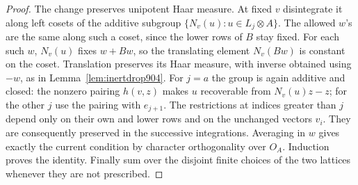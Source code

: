 \documentclass[a4paper,11pt]{article}
\theoremstyle{definition}
\theoremstyle{remark}
\numberwithin{equation}{section}
\begin{document}
\begin{proof}
The change preserves unipotent Haar measure. At fixed \(v\)
disintegrate it along left cosets of the additive subgroup
\(\{N_v(u):u\in L_j\otimes A\}\). The allowed \(w\)'s are the
same along such a coset, since the lower rows of \(B\) stay
fixed. For each such \(w\), \(N_v(u)\) fixes \(w+Bw\), so the
translating element \(N_v(Bw)\) is constant on the coset.
Translation preserves its Haar measure, with inverse obtained
using \(-w\), as in Lemma~\ref{lem:inertdrop904}.
For \(j=a\) the group is again additive and closed: the nonzero
pairing \(h(v,z)\) makes \(u\) recoverable from \(N_v(u)z-z\);
for the other \(j\) use the pairing with \(e_{j+1}\).
The restrictions at indices greater than \(j\) depend only on
their own and lower rows and on the unchanged vectors \(v_i\).
They are consequently preserved in the successive integrations.
Averaging in \(w\) gives exactly the current condition by
character orthogonality over \(O_A\). Induction proves the
identity. Finally sum over the disjoint finite choices of the
two lattices whenever they are not prescribed.
\end{proof}
\end{document}
